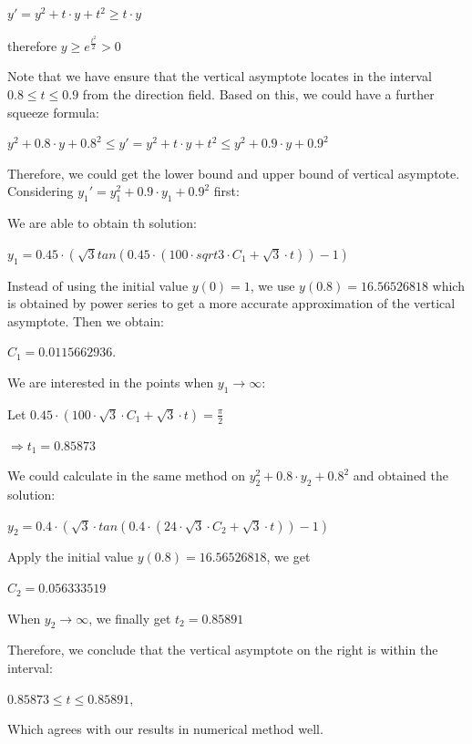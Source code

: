 \documentclass[11pt,a4paper]{article}
\begin{document}
	\begin{center}
		$y'=y^2+t \cdot y+t^2 \geq t \cdot y$

		therefore $y \geq e^{\frac{t^2}{2}}>0$
	\end{center}

	Note that we have ensure that the vertical asymptote locates in the interval $0.8\leq t \leq 0.9$ from the direction field. Based on this, we could have a further squeeze formula: 
	\begin{center}
		$y^2+0.8 \cdot y+0.8^2 \leq y' = y^2+t \cdot y+t^2 \leq y^2+0.9 \cdot y+0.9^2$
	\end{center}
	Therefore, we could get the lower bound and upper bound of vertical asymptote. Considering $y_1'=y_1^2+0.9 \cdot y_1+0.9^2$ first:

	We are able to obtain th solution:
	\begin{center}
		$y_1=0.45 \cdot (\sqrt3tan(0.45 \cdot (100 \cdot sqrt3 \cdot C_1+\sqrt{3} \cdot t))-1)$
	\end{center}
	Instead of using the initial value $y(0)=1$, we use $y(0.8)=16.56526818$ which is obtained by power series to get a more accurate approximation of the vertical asymptote. Then we obtain: 
	\begin{center}
		$C_1=0.0115662936$.
	\end{center}
	We are interested in the points when $y_1 \rightarrow \infty$:
	\begin{center}
		Let $0.45 \cdot (100 \cdot \sqrt3 \cdot C_1+\sqrt3 \cdot t)=\frac{\pi}{2}$ 
		
		$\Rightarrow t_1 = 0.85873$
	\end{center}

	We could calculate in the same method on $y_2^2+0.8 \cdot y_2+0.8^2$ and obtained the solution:

	\begin{center}
		$y_2=0.4 \cdot (\sqrt{3} \cdot tan(0.4 \cdot (24 \cdot \sqrt{3} \cdot C_2+\sqrt{3} \cdot t))-1)$
	\end{center}

	Apply the initial value $y(0.8) = 16.56526818$, we get 

	\begin{center}
		$C_2=0.056333519$
	\end{center}

	When $y_2 \rightarrow \infty$, we finally get $t_2=0.85891$

	Therefore, we conclude that the vertical asymptote on the right is within the interval:
	\begin{center}
		$0.85873 \leq t \leq 0.85891$,
	\end{center}
	 Which agrees with our results in numerical method well.
	
\end{document}
